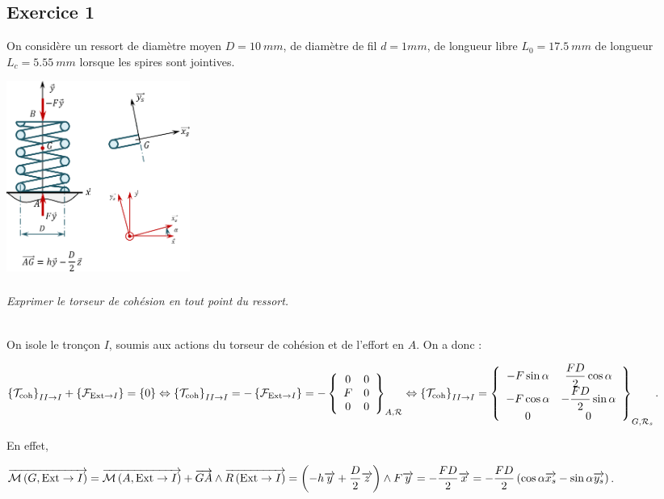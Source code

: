 \documentclass[10pt,fleqn]{article} %
\begin{document}

\vspace{8cm}
\pagestyle{fancy}
\thispagestyle{plain}


\def\columnseprulecolor{\color{ocre}}
\setlength{\columnseprule}{0.4pt} 
\begin{multicols}{2}

\section*{Exercice 1}
\setcounter{subparagraph}{0}
On considère un ressort de diamètre moyen  $D=\SI{10}{mm}$, de diamètre de fil $d=\si{1}{mm}$, de longueur libre $L_0 = \SI{17,5}{mm}$ de longueur $L_c =\SI{5,55}{mm}$ lorsque les spires sont jointives.  

\begin{center}
\includegraphics[width=6cm]{images/ressort_01}
\end{center}

\subparagraph{}\textit{Exprimer le torseur de cohésion en tout point du ressort.}

\ifprof
\begin{corrige}~\\

On isole le tronçon $I$, soumis aux actions du torseur de cohésion et de l'effort en $A$. 
On a donc  :


$
\torseurscoh_{II \rightarrow I} 
+\left\{\mathcal{F}_{\text{Ext}\rightarrow I}\right\}   = \{0\} 
\Leftrightarrow 
\torseurscoh_{II \rightarrow I} 
= - \left\{\mathcal{F}_{\text{Ext}\rightarrow I}\right\} 
= - \torseurcol{0}{F}{0}{0}{0}{0}{A,\mathcal{R}}
\Leftrightarrow 
\torseurscoh_{II \rightarrow I} 
= \torseurcol{ -F \sin \alpha }{-F \cos \alpha }{0}{\dfrac{FD}{2}\cos\alpha}{-\dfrac{FD}{2}\sin\alpha}{0}{G,\mathcal{R}_s}
$.

En effet, 

$
\vectm{G}{\text{Ext}}{I} 
= \vectm{A}{\text{Ext}}{I} +\vect{GA} \wedge \vectf{\text{Ext}}{I}
= \left(-h \vect{y} +\dfrac{D}{2}\vect{z} \right) \wedge F \vect{y}
= -\dfrac{FD}{2}\vect{x}
= -\dfrac{FD}{2}\left(\cos\alpha \vect{x_s} - \sin\alpha \vect{y_s} \right)
$.


\end{corrige}
\end{multicols}
\end{document}
